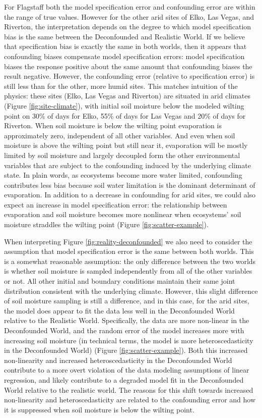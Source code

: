 For Flagstaff both the model specification error and confounding error
are within the range of true values. However for the other arid sites
of Elko, Las Vegas, and Riverton, the interpretation depends on the
degree to which model specification bias is the same between the
Deconfounded and Realistic World. If we believe that specification
bias is exactly the same in both worlds, then it appears that
confounding biases compensate model specification errors: model
specification biases the response positive about the same amount that
confounding biases the result negative. However, the confounding error
(relative to specification error) is still less than for the other,
more humid sites. This matches intuition of the physics: these sites
(Elko, Las Vegas and Riverton) are situated in arid climates (Figure
\ref{fig:site-climate}), with initial soil moisture below the modeled
wilting point on 30\% of days for Elko, 55\% of days for Las Vegas and
20\% of days for Riverton. When soil moisture is below the wilting
point evaporation is approximately zero, independent of all other
variables.  And even when soil moisture is above the wilting point but
still near it, evaporation will be mostly limited by soil moisture and
largely decoupled form the other environmental variables that are
subject to the confounding induced by the underlying climate state. In
plain words, as ecosystems become more water limited, confounding
contributes less bias because soil water limitation is the dominant
determinant of evaporation. In addition to a decrease in confounding
for arid sites, we could also expect an increase in model
specification error: the relationship between evaporation and soil
moisture becomes more nonlinear when ecosystems' soil moisture
straddles the wilting point (Figure \ref{fig:scatter-example}).

When interpreting Figure \ref{fig:reality-deconfounded} we also need
to consider the assumption that model specification error is the same
between both worlds. This is a somewhat reasonable assumption: the
only difference between the two worlds is whether soil moisture is
sampled independently from all of the other variables or not. All
other initial and boundary conditions maintain their same joint
distribution consistent with the underlying climate. However, this
slight difference of soil moisture sampling is still a difference, and
in this case, for the arid sites, the model does appear to fit the
data less well in the Deconfounded World relative to the Realistic
World. Specifically, the data are more non-linear in the Deconfounded
World, and the random error of the model increases more with
increasing soil moisture (in technical terms, the model is more
heteroscedasticity in the Deconfounded World) (Figure
\ref{fig:scatter-example}). Both this increased non-linearity and
increased heteroscedasticity in the Deconfounded World contribute to a
more overt violation of the data modeling assumptions of linear regression,
and likely contribute to a degraded model fit in the Deconfounded
World relative to the realistic world. The reasons for this shift
towards increased non-linearity and heteroscedasticity are related to
the confounding error and how it is suppressed when soil moisture is
below the wilting point.

